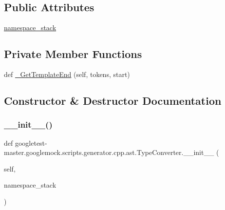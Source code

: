 \subsection*{Public Attributes}
\begin{DoxyCompactItemize}
\item 
\mbox{\hyperlink{classgoogletest-master_1_1googlemock_1_1scripts_1_1generator_1_1cpp_1_1ast_1_1_type_converter_a538f21b1fb4b67e25f20a5aaa8d1058c}{namespace\+\_\+stack}}
\end{DoxyCompactItemize}
\subsection*{Private Member Functions}
\begin{DoxyCompactItemize}
\item 
def \mbox{\hyperlink{classgoogletest-master_1_1googlemock_1_1scripts_1_1generator_1_1cpp_1_1ast_1_1_type_converter_af453690249d9672137ca246fd13de818}{\+\_\+\+Get\+Template\+End}} (self, tokens, start)
\end{DoxyCompactItemize}


\subsection{Constructor \& Destructor Documentation}
\mbox{\label{classgoogletest-master_1_1googlemock_1_1scripts_1_1generator_1_1cpp_1_1ast_1_1_type_converter_a5567588cc285796dcc37f47cce576576}} 
\subsubsection{\texorpdfstring{\_\_init\_\_()}{\_\_init\_\_()}}
{\footnotesize\ttfamily def googletest-\/master.\+googlemock.\+scripts.\+generator.\+cpp.\+ast.\+Type\+Converter.\+\_\+\+\_\+init\+\_\+\+\_\+ (\begin{DoxyParamCaption}\item[{}]{self,  }\item[{}]{namespace\+\_\+stack }\end{DoxyParamCaption})}



